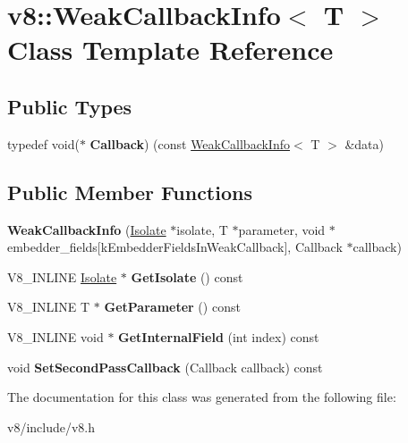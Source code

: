 \hypertarget{classv8_1_1WeakCallbackInfo}{}\section{v8\+:\+:Weak\+Callback\+Info$<$ T $>$ Class Template Reference}
\label{classv8_1_1WeakCallbackInfo}
\subsection*{Public Types}
\begin{DoxyCompactItemize}
\item 
\mbox{\label{classv8_1_1WeakCallbackInfo_a75f50fddcc9d5989e9cc04f8ab144d7d}} 
typedef void($\ast$ {\bfseries Callback}) (const \mbox{\hyperlink{classv8_1_1WeakCallbackInfo}{Weak\+Callback\+Info}}$<$ T $>$ \&data)
\end{DoxyCompactItemize}
\subsection*{Public Member Functions}
\begin{DoxyCompactItemize}
\item 
\mbox{\label{classv8_1_1WeakCallbackInfo_aabf19115b690b9baf1da8f440dfb3aa6}} 
{\bfseries Weak\+Callback\+Info} (\mbox{\hyperlink{classv8_1_1Isolate}{Isolate}} $\ast$isolate, T $\ast$parameter, void $\ast$embedder\+\_\+fields\mbox{[}k\+Embedder\+Fields\+In\+Weak\+Callback\mbox{]}, Callback $\ast$callback)
\item 
\mbox{\label{classv8_1_1WeakCallbackInfo_a4cc354ee04d52d5ab880f1e9f85966c1}} 
V8\+\_\+\+I\+N\+L\+I\+NE \mbox{\hyperlink{classv8_1_1Isolate}{Isolate}} $\ast$ {\bfseries Get\+Isolate} () const
\item 
\mbox{\label{classv8_1_1WeakCallbackInfo_a7fcf0d86f88eb066967de3c0e4a77ed4}} 
V8\+\_\+\+I\+N\+L\+I\+NE T $\ast$ {\bfseries Get\+Parameter} () const
\item 
\mbox{\label{classv8_1_1WeakCallbackInfo_a00732c95f8c130fba45ee6bbb3d3d819}} 
V8\+\_\+\+I\+N\+L\+I\+NE void $\ast$ {\bfseries Get\+Internal\+Field} (int index) const
\item 
\mbox{\label{classv8_1_1WeakCallbackInfo_af0f671ce037ff91319683e8f01645865}} 
void {\bfseries Set\+Second\+Pass\+Callback} (Callback callback) const
\end{DoxyCompactItemize}


The documentation for this class was generated from the following file\+:\begin{DoxyCompactItemize}
\item 
v8/include/v8.\+h\end{DoxyCompactItemize}
